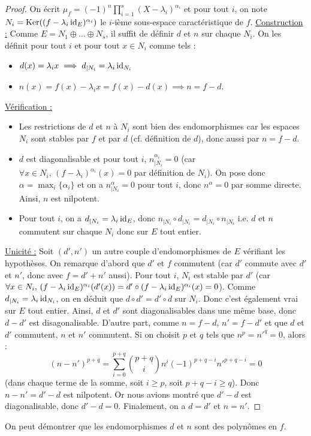 	\begin{proof}
		On écrit $\mu_f = (-1)^n \prod_{i=1}^s (X - \lambda_i)^{\alpha_i}$ et pour tout $i$, on note $N_i = \mathrm{Ker}((f-\lambda_i \operatorname{id}_E)^{\alpha_i})$ le $i$-ième sous-espace caractéristique de $f$.
		\newpar
		\uline{Construction :} Comme $E = N_1 \oplus \dots \oplus N_s$, il suffit de définir $d$ et $n$ sur chaque $N_i$. On les définit pour tout $i$ et pour tout $x \in N_i$ comme tels :
		\begin{itemize}
			\item $d(x) = \lambda_i x \implies d_{|N_i} = \lambda_i \operatorname{id}_{N_i}$
			\item $n(x) = f(x) - \lambda_i x = f(x) - d(x) \implies n = f - d$.
		\end{itemize}
		\medskip
		\uline{Vérification :}
		\begin{itemize}
			\item Les restrictions de $d$ et $n$ à $N_i$ sont bien des endomorphismes car les espaces $N_i$ sont stables par $f$ et par $d$ (cf. définition de $d$), donc aussi par $n = f - d$.
			\item $d$ est diagonalisable et pour tout $i$, $n_{|N_i}^{\alpha_i} = 0$ (car $\forall x \in N_i, \, (f-\lambda_i)^{\alpha_i}(x) = 0$ par définition de $N_i$). On pose donc $\alpha = \max_{i} \{ \alpha_i \}$ et on a $n_{|N_i}^\alpha = 0$ pour tout $i$, donc $n^\alpha = 0$ par somme directe. Ainsi, $n$ est nilpotent.
			\item Pour tout $i$, on a $d_{|N_i} = \lambda_i \operatorname{id}_E$, donc $n_{|N_i} \circ d_{|N_i} = d_{|N_i} \circ n_{|N_i}$ i.e. $d$ et $n$ commutent sur chaque $N_i$ donc sur $E$ tout entier.
		\end{itemize}
		\medskip
		\uline{Unicité :} Soit $(d', n')$ un autre couple d'endomorphismes de $E$ vérifiant les hypothèses. On remarque d'abord que $d'$ et $f$ commutent (car $d'$ commute avec $d'$ et $n'$, donc avec $f = d' + n'$ aussi). Pour tout $i$, $N_i$ est stable par $d'$ (car $\forall x \in N_i, \, (f-\lambda_i \operatorname{id}_E)^{\alpha_i}(d'(x)) = d' \circ (f-\lambda_i \operatorname{id}_E)^{\alpha_i}(x) = 0$). Comme $d_{|N_i} = \lambda_i \operatorname{id}_{N_i}$, on en déduit que $d \circ d' = d' \circ d$ sur $N_i$. Donc c'est également vrai sur $E$ tout entier. Ainsi, $d$ et $d'$ sont diagonalisables dans une même base, donc $d - d'$ est disagonalisable.
		\newpar
		D'autre part, comme $n = f-d$, $n' = f-d'$ et que $d$ et $d'$ commutent, $n$ et $n'$ commutent. Si on choisit $p$ et $q$ tels que $n^p = n'^q = 0$, alors :
		\[ (n-n')^{p+q} = \sum_{i=0}^{p+q} \binom{p+q}{i} n^{i} (-1)^{p+q-i} n'^{p+q-i} = 0 \]
		(dans chaque terme de la somme, soit $i \geq p$, soit $p+q-i \geq q$). Donc $n - n' = d' - d$ est nilpotent. Or nous avions montré que $d' - d$ est diagonalisable, donc $d'-d = 0$. Finalement, on a $d = d'$ et $n = n'$.
	\end{proof}

	\begin{remark}
		On peut démontrer que les endomorphismes $d$ et $n$ sont des polynômes en $f$.
	\end{remark}

